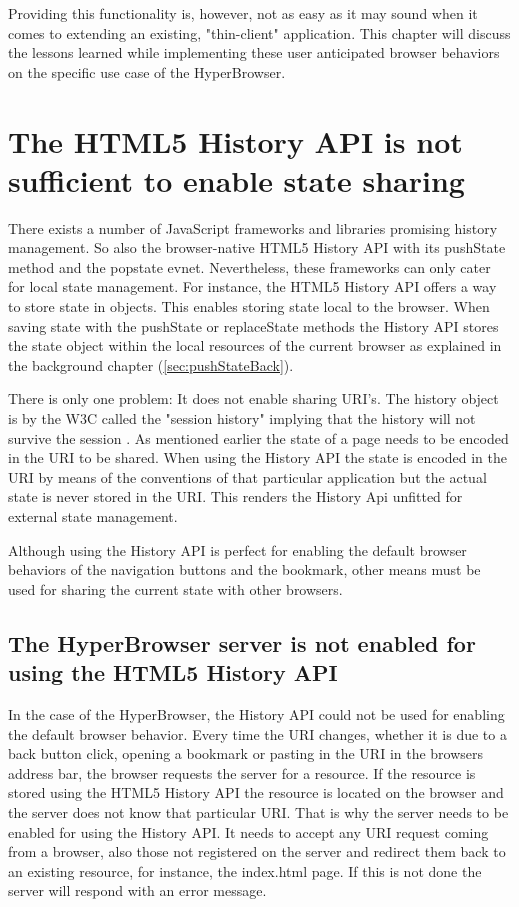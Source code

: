 \documentclass[english]{ifimaster}
\begin{document}
Providing this functionality is, however, not as easy as it may sound when it comes to extending an existing, "thin-client" application. This chapter will discuss the lessons learned while implementing these user anticipated browser behaviors on the specific use case of the HyperBrowser.

\section{The HTML5 History API is not sufficient to enable state sharing}
There exists a number of JavaScript frameworks and libraries promising history management. So also the browser-native HTML5 History API with its pushState method and the popstate evnet. Nevertheless, these frameworks can only cater for local state management. For instance, the HTML5 History API offers a way to store state in objects. This enables storing state local to the browser. When saving state with the pushState or replaceState methods the History API stores the state object within the local resources of the current browser as explained in the background chapter (\ref{sec:pushStateBack}).

There is only one problem: It does not enable sharing URI's. The history object is by the W3C called the "session history" implying that the history will not survive the session \parencite{sessionHistory}. As mentioned earlier the state of a page needs to be encoded in the URI to be shared. When using the History API the state is encoded in the URI by means of the conventions of that particular application but the actual state is never stored in the URI. This renders the History Api unfitted for external state management.
  
Although using the History API is perfect for enabling the default browser behaviors of the navigation buttons and the bookmark, other means must be used for sharing the current state with other browsers.

\subsection{The HyperBrowser server is not enabled for using the HTML5 History API}
In the case of the HyperBrowser, the History API could not be used for enabling the default browser behavior. Every time the URI changes, whether it is due to a back button click, opening a bookmark or pasting in the URI in the browsers address bar, the browser requests the server for a resource. If the resource is stored using the HTML5 History API the resource is located on the browser and the server does not know that particular URI. That is why the server needs to be enabled for using the History API. It needs to accept any URI request coming from a browser, also those not registered on the server and redirect them back to an existing resource, for instance, the index.html page. If this is not done the server will respond with an error message.
\end{document}
